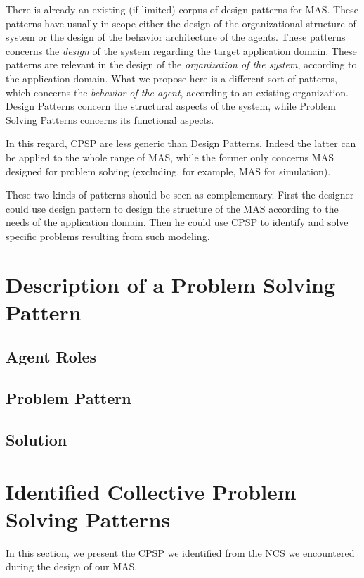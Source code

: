 There is already an existing (if limited) corpus of design patterns for MAS. These patterns have usually in scope either the design of the organizational structure of system or the design of the behavior architecture of the agents. These patterns concerns the \emph{design} of the system regarding the target application domain. These patterns are relevant in the design of the \emph{organization of the system}, according to the application domain.
What we propose here is a different sort of patterns, which concerns the \emph{behavior of the agent}, according to an existing organization. Design Patterns concern the structural aspects of the system, while Problem Solving Patterns concerns its functional aspects.

In this regard, CPSP are less generic than Design Patterns. Indeed the latter can be applied to the whole range of MAS, while the former only concerns MAS designed for problem solving (excluding, for example, MAS for simulation).

These two kinds of patterns should be seen as complementary. First the designer could use design pattern to design the structure of the MAS according to the needs of the application domain. Then he could use CPSP to identify and solve specific problems resulting from such modeling.

\section{Description of a Problem Solving Pattern}

\subsection{Agent Roles}

\subsection{Problem Pattern}

\subsection{Solution}

\section{Identified Collective Problem Solving Patterns}

In this section, we present the CPSP we identified from the NCS we encountered during the design of our MAS.

